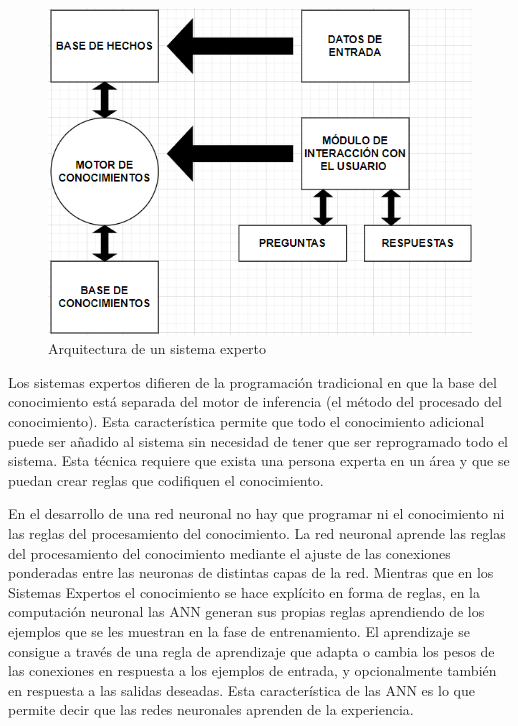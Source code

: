 \begin{figure}[H]
  \begin{center}
    \includegraphics[scale=0.90]{./hechos.png}
    \caption{Arquitectura de un sistema experto}
    \label{fig:Arquitectura de un sistema experto}
  \end{center}
\end{figure}

Los sistemas expertos difieren de la programación tradicional en que la base del conocimiento está separada del motor de inferencia (el método del procesado del conocimiento). Esta característica permite que todo el conocimiento adicional puede ser añadido al sistema sin necesidad de tener que ser reprogramado todo el sistema. Esta técnica requiere que exista una persona experta en un área y que se puedan crear reglas que codifiquen el conocimiento\cite{basogain2008redes}.

En el desarrollo de una red neuronal no hay que programar ni el conocimiento ni las reglas del procesamiento del conocimiento. La red neuronal aprende las reglas del procesamiento del conocimiento mediante el ajuste de las conexiones ponderadas entre las neuronas de distintas capas de la red. Mientras que en los Sistemas Expertos el conocimiento se hace explícito en forma de reglas, en la computación neuronal las ANN generan sus propias reglas aprendiendo de los ejemplos que se les muestran en la fase de entrenamiento. El aprendizaje se consigue a través de una regla de aprendizaje que adapta o cambia los pesos de las conexiones en respuesta a los ejemplos de entrada, y opcionalmente también en respuesta a las salidas deseadas. Esta característica de las ANN es lo que permite decir que las redes neuronales aprenden de la experiencia\cite{basogain2008redes}. 

